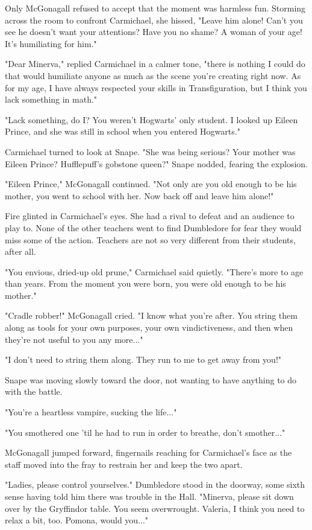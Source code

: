 \documentclass[a4paper,11pt]{article}
\begin{document}
Only McGonagall refused to accept that the moment was harmless fun. Storming across the room to confront Carmichael, she hissed, "Leave him alone! Can't you see he doesn't want your attentions? Have you no shame? A woman of your age! It's humiliating for him."

"Dear Minerva," replied Carmichael in a calmer tone, "there is nothing I could do that would humiliate anyone as much as the scene you're creating right now. As for my age, I have always respected your skills in Transfiguration, but I think you lack something in math."

"Lack something, do I? You weren't Hogwarts' only student. I looked up Eileen Prince, and she was still in school when you entered Hogwarts."

Carmichael turned to look at Snape. "She was being serious? Your mother was Eileen Prince? Hufflepuff's gobstone queen?" Snape nodded, fearing the explosion.

"Eileen Prince," McGonagall continued. "Not only are you old enough to be his mother, you went to school with her. Now back off and leave him alone!"

Fire glinted in Carmichael's eyes. She had a rival to defeat and an audience to play to. None of the other teachers went to find Dumbledore for fear they would miss some of the action. Teachers are not so very different from their students, after all.

"You envious, dried-up old prune," Carmichael said quietly. "There's more to age than years. From the moment you were born, you were old enough to be his mother."

"Cradle robber!" McGonagall cried. "I know what you're after. You string them along as tools for your own purposes, your own vindictiveness, and then when they're not useful to you any more..."

"I don't need to string them along. They run to me to get away from you!"

Snape was moving slowly toward the door, not wanting to have anything to do with the battle.

"You're a heartless vampire, sucking the life..."

"You smothered one 'til he had to run in order to breathe, don't smother..."

McGonagall jumped forward, fingernails reaching for Carmichael's face as the staff moved into the fray to restrain her and keep the two apart.

"Ladies, please control yourselves." Dumbledore stood in the doorway, some sixth sense having told him there was trouble in the Hall. "Minerva, please sit down over by the Gryffindor table. You seem overwrought. Valeria, I think you need to relax a bit, too. Pomona, would you..."
\end{document}
